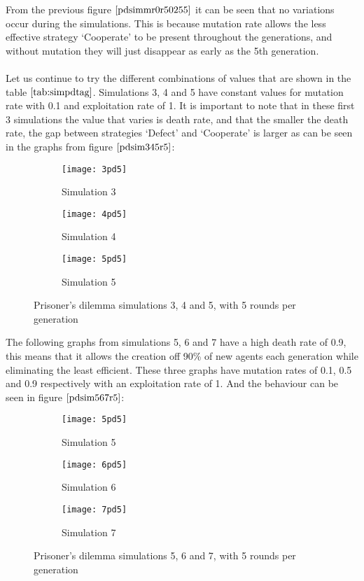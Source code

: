 From the previous figure $\ref{pdsimmr0r50255}$ it can be seen that no variations occur during the simulations. This is because mutation rate allows the less effective strategy `Cooperate' to be present throughout the generations, and without mutation they will just disappear as early as the 5th generation. 
\\\\Let us continue to try the different combinations of values that are shown in the table $\ref{tab:simpdtag}$. 
Simulations 3, 4 and 5 have constant values for mutation rate with 0.1 and exploitation rate of 1. It is important to note that in these first 3 simulations the value that varies is death rate, and that the smaller the death rate, the gap between strategies `Defect' and `Cooperate' is larger as can be seen in the graphs from figure $\ref{pdsim345r5}$:

\begin{figure}[H]       
    \centering
    \begin{subfigure}[b]{0.3\textwidth}
	\centering
	{\texttt{[image: 3pd5]}}   
    	\caption{Simulation 3}
	\label{fig:pds3}
    \end{subfigure}
    \hfill
    \begin{subfigure}[b]{0.3\textwidth}
	\centering
	{\texttt{[image: 4pd5]}}   
    	\caption{Simulation 4}
	\label{fig:pds4}
    \end{subfigure}
    \hfill
    \begin{subfigure}[b]{0.3\textwidth}
	\centering
	{\texttt{[image: 5pd5]}}   
    	\caption{Simulation 5}
	\label{fig:pds5}
    \end{subfigure}
    \caption{Prisoner's dilemma simulations 3, 4 and 5, with 5 rounds per generation}
    \label{pdsim345r5}
\end{figure}

The following graphs from simulations 5, 6 and 7  have a high death rate of 0.9, this means that it allows the creation off 90\% of new agents each generation while eliminating the least efficient. These three graphs have mutation rates of 0.1, 0.5 and 0.9 respectively with an exploitation rate of 1. And the behaviour can be seen  in figure $\ref{pdsim567r5}$:

\begin{figure}[H]       
    \centering
    \begin{subfigure}[b]{0.3\textwidth}
	\centering
	{\texttt{[image: 5pd5]}}   
    	\caption{Simulation 5}
	\label{fig:pds5}
    \end{subfigure}
    \hfill
    \begin{subfigure}[b]{0.3\textwidth}
	\centering
	{\texttt{[image: 6pd5]}}   
    	\caption{Simulation 6}
	\label{fig:pds6}
    \end{subfigure}
    \hfill
    \begin{subfigure}[b]{0.3\textwidth}
	\centering
	{\texttt{[image: 7pd5]}}   
    	\caption{Simulation 7}
	\label{fig:pds7}
    \end{subfigure}
    \caption{Prisoner's dilemma simulations 5, 6 and 7, with 5 rounds per generation}
    \label{pdsim567r5}
\end{figure}

